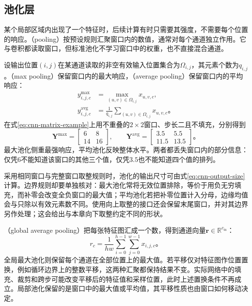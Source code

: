 \subsection{池化层}
\label{sec:cnn-pooling}

某个局部区域内出现了一个特征时，后续计算有时只需要其强度，不需要每个位置的响应。（pooling）按预设规则汇聚窗口内的数值，通常对每个通道独立作用。它与卷积都读取窗口，但标准池化不学习窗口中的权重，也不直接混合通道。

设输出位置$(i,j)$在某通道读取的非空有效输入位置集合为$\Omega_{i,j}$，其元素个数为$q_{i,j}$。（max pooling）保留窗口内的最大响应，（average pooling）保留窗口内的平均响应：
\begin{equation}
  \begin{aligned}
    y_{i,j,c}^{\mathrm{max}}&=\max_{(u,v)\in\Omega_{i,j}}x_{u,v,c},\\
    y_{i,j,c}^{\mathrm{avg}}&=\frac1{q_{i,j}}
                   \sum_{(u,v)\in\Omega_{i,j}}x_{u,v,c}\text{。}
  \end{aligned}
  \label{eq:cnn-local-pooling}
\end{equation}
在式\eqref{eq:cnn-matrix-example}上用不重叠的$2\times2$窗口、步长二且不填充，分别得到
\begin{equation}
  \bm Y^{\mathrm{max}}=\begin{bmatrix}6&8\\14&16\end{bmatrix},\qquad
  \bm Y^{\mathrm{avg}}=\begin{bmatrix}3.5&5.5\\11.5&13.5\end{bmatrix}\text{。}
  \label{eq:cnn-pooling-example}
\end{equation}
最大池化侧重最强响应，平均池化反映整体水平。两者都丢失窗口内的部分信息：仅凭$6$不能知道该窗口的其他三个值，仅凭$3.5$也不能知道四个值的排列。

采用相同窗口与完整窗口取整规则时，池化的输出尺寸可由式\eqref{eq:cnn-output-size}计算。边界规则却要单独核对：最大池化常将无效位置排除，等价于用负无穷填充，而补零会改变全负窗口的最大值；平均池化若把补零位置计入分母，边缘均值会与只除以有效元素数不同。使用向上取整的接口还会保留末尾窗口，并对其边界另作处理；这会给出与本章向下取整约定不同的形状。

（global average pooling）把每张特征图汇成一个数，得到通道向量$\bm r\in\mathbb R^{c_{\mathrm{in}}}$：
\begin{equation}
  r_c=\frac1{hw}\sum_{i=0}^{h-1}\sum_{j=0}^{w-1}x_{i,j,c}\text{。}
  \label{eq:cnn-global-average-pooling}
\end{equation}
全局最大池化则保留每个通道在全部位置上的最大值。若平移仅对特征图作位置置换，例如循环边界上的整数平移，这两种汇聚都保持结果不变。实际网络中的填充、裁剪和跨步可能改变平移后的特征值和采样位置，此时上述置换条件不再成立。局部池化保留的是窗口中的最大值或平均值，其平移性质也由窗口如何移动决定。

